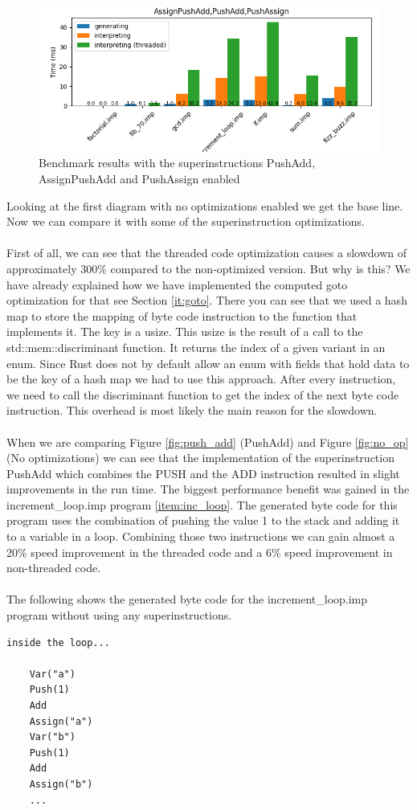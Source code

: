 \documentclass{article}
\begin{document}
\begin{figure}[h]
    \centering
    \includegraphics[width=1\textwidth]{../BenchmarkImages/AssignPushAdd_PushAdd_PushAssign.png}
    \caption{Benchmark results with the superinstructions PushAdd, AssignPushAdd and PushAssign enabled}
    \label{fig:all_op}
\end{figure}

Looking at the first diagram with no optimizations enabled we get the base
line. Now we can compare it with some of the superinstruction optimizations.
\\\\
First of all, we can see that the threaded code optimization causes a slowdown
of approximately 300\% compared to the non-optimized version. But why is this?
We have already explained how we have implemented the computed goto
optimization for that see Section \ref{it:goto}. There you can see that we used
a hash map to store the mapping of byte code instruction to the function that
implements it. The key is a usize. This usize is the result of a call to the
std::mem::discriminant function. It returns the index of a given variant in an
enum. Since Rust does not by default allow an enum with fields that hold data
to be the key of a hash map we had to use this approach. After every
instruction, we need to call the discriminant function to get the index of the
next byte code instruction. This overhead is most likely the main reason for
the slowdown.
\\\\
When we are comparing Figure \ref{fig:push_add} (PushAdd) and Figure
\ref{fig:no_op} (No optimizations) we can see that the implementation of the
superinstruction PushAdd which combines the PUSH and the ADD instruction
resulted in slight improvements in the run time.
The biggest performance benefit was gained in the increment\_loop.imp program
\ref{item:inc_loop}. The generated byte code for this program uses the
combination of pushing the value 1 to the stack and adding it to a variable in
a loop. Combining those two instructions we can gain almost a 20\% speed
improvement in the threaded code and a 6\% speed improvement in non-threaded
code.
\\\\
The following shows the generated byte code for the increment\_loop.imp program
without using any superinstructions.
\begin{verbatim}
inside the loop...

    Var("a")
    Push(1)
    Add
    Assign("a")
    Var("b")
    Push(1)
    Add
    Assign("b")
    ...
\end{verbatim}
\end{document}
